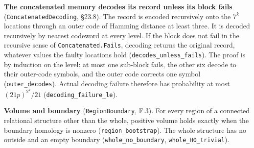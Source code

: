 \documentclass[
]{article}
\begin{document}
\textbf{The concatenated memory decodes its record unless its block
fails}
(\texttt{C\allowbreak{}o\allowbreak{}n\allowbreak{}c\allowbreak{}a\allowbreak{}t\allowbreak{}e\allowbreak{}n\allowbreak{}a\allowbreak{}t\allowbreak{}e\allowbreak{}d\allowbreak{}D\allowbreak{}e\allowbreak{}c\allowbreak{}o\allowbreak{}d\allowbreak{}i\allowbreak{}n\allowbreak{}g},
§23.8). The record is encoded recursively onto the \(7^k\) locations
through an outer code of Hamming distance at least three. It is decoded
recursively by nearest codeword at every level. If the block does not
fail in the recursive sense of
\texttt{C\allowbreak{}o\allowbreak{}n\allowbreak{}c\allowbreak{}a\allowbreak{}t\allowbreak{}e\allowbreak{}n\allowbreak{}a\allowbreak{}t\allowbreak{}e\allowbreak{}d\allowbreak{}.\allowbreak{}F\allowbreak{}a\allowbreak{}i\allowbreak{}l\allowbreak{}s},
decoding returns the original record, whatever values the faulty
locations hold
(\texttt{d\allowbreak{}e\allowbreak{}c\allowbreak{}o\allowbreak{}d\allowbreak{}e\allowbreak{}s\allowbreak{}\_\allowbreak{}u\allowbreak{}n\allowbreak{}l\allowbreak{}e\allowbreak{}s\allowbreak{}s\allowbreak{}\_\allowbreak{}f\allowbreak{}a\allowbreak{}i\allowbreak{}l\allowbreak{}s}).
The proof is by induction on the level: at most one sub-block fails, the
other six decode to their outer-code symbols, and the outer code
corrects one symbol (\texttt{outer\_decodes}). Actual decoding failure
therefore has probability at most \((21p)^{2^k}/21\)
(\texttt{d\allowbreak{}e\allowbreak{}c\allowbreak{}o\allowbreak{}d\allowbreak{}i\allowbreak{}n\allowbreak{}g\allowbreak{}\_\allowbreak{}f\allowbreak{}a\allowbreak{}i\allowbreak{}l\allowbreak{}u\allowbreak{}r\allowbreak{}e\allowbreak{}\_\allowbreak{}l\allowbreak{}e}).

\textbf{Volume and boundary} (\texttt{RegionBoundary}, F.3). For every
region of a connected relational structure other than the whole,
positive volume holds exactly when the boundary homology is nonzero
(\texttt{region\_bootstrap}). The whole structure has no outside and an
empty boundary
(\texttt{w\allowbreak{}h\allowbreak{}o\allowbreak{}l\allowbreak{}e\allowbreak{}\_\allowbreak{}n\allowbreak{}o\allowbreak{}\_\allowbreak{}b\allowbreak{}o\allowbreak{}u\allowbreak{}n\allowbreak{}d\allowbreak{}a\allowbreak{}r\allowbreak{}y},
\texttt{whole\_H0\_trivial}).
\end{document}
